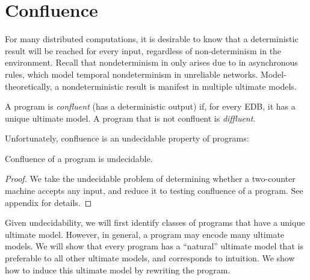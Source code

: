 \section{Confluence}

For many distributed computations, it is desirable to know that a deterministic result will be reached for every input, regardless of non-determinism in the environment.  Recall that nondeterminism in \lang only arises due to  in asynchronous rules, 
which model temporal nondeterminism in unreliable networks.
Model-theoretically, a nondeterministic result is manifest in multiple ultimate models.

\begin{definition}
A \lang program is {\em confluent} (has a deterministic output) if, for every EDB, it has a unique ultimate model.  A program that is not confluent is {\em diffluent}.
\end{definition}

Unfortunately, confluence is an undecidable property of \lang programs:

\begin{lemma}
\label{lem:confluence-undecidable}
Confluence of a \lang program is undecidable.
\end{lemma}
\begin{proof}
We take the undecidable problem of determining whether a two-counter machine accepts any input, and reduce it to testing confluence of a \lang program.  See appendix for details.
\end{proof}

Given undecidability, we will first identify classes of programs that have a unique ultimate model.  However, in general, a \lang program may encode many ultimate models.  We will show that every \lang program has a ``natural'' ultimate model that is preferable to all other ultimate models, and corresponds to intuition.  We show how to induce this ultimate model by rewriting the program.


